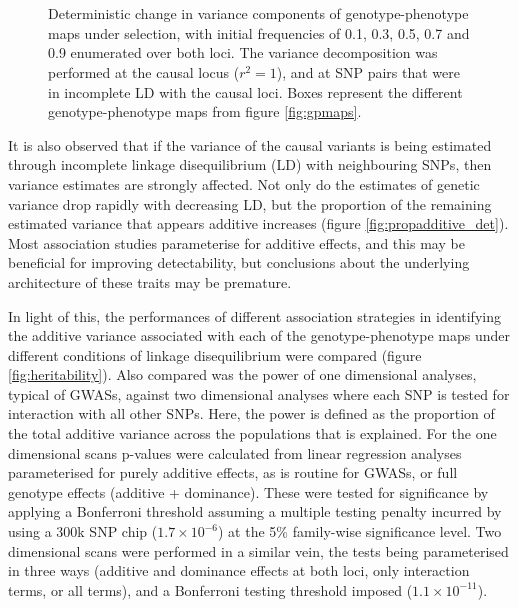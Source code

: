 \begin{figure}
\begin{center}
 \\
 \\
\caption[Deterministic change in variance components]{Deterministic change in variance components of genotype-phenotype maps under selection, with initial frequencies of 0.1, 0.3, 0.5, 0.7 and 0.9 enumerated over both loci. The variance decomposition was performed at the causal locus ($r^{2}=1$), and at SNP pairs that were in incomplete LD with the causal loci. Boxes represent the different genotype-phenotype maps from figure \ref{fig:gpmaps}.}
\label{fig:var_det}
\end{center}
\end{figure}

It is also observed that if the variance of the causal variants is being estimated through incomplete linkage disequilibrium (LD) with neighbouring SNPs, then variance estimates are strongly affected. Not only do the estimates of genetic variance drop rapidly with decreasing LD, but the proportion of the remaining estimated variance that appears additive increases (figure \ref{fig:propadditive_det}). Most association studies parameterise for additive effects, and this may be beneficial for improving detectability, but conclusions about the underlying architecture of these traits may be premature.

In light of this, the performances of different association strategies in identifying the additive variance associated with each of the genotype-phenotype maps under different conditions of linkage disequilibrium were compared (figure \ref{fig:heritability}). Also compared was the power of one dimensional analyses, typical of GWASs, against two dimensional analyses where each SNP is tested for interaction with all other SNPs. Here, the power is defined as the proportion of the total additive variance across the populations that is explained. For the one dimensional scans p-values were calculated from linear regression analyses parameterised for purely additive effects, as is routine for GWASs, or full genotype effects (additive + dominance). These were tested for significance by applying a Bonferroni threshold assuming a multiple testing penalty incurred by using a 300k SNP chip ($1.7\times10^{-6}$) at the 5\% family-wise significance level. Two dimensional scans were performed in a similar vein, the tests being parameterised in three ways (additive and dominance effects at both loci, only interaction terms, or all terms), and a Bonferroni testing threshold imposed ($1.1\times10^{-11}$).

